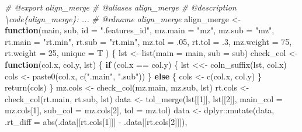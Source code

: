 \documentclass[
]{article}
\newenvironment{Shaded}{\begin{snugshade}}{\end{snugshade}}
\newcommand{\AttributeTok}[1]{\textcolor[rgb]{0.77,0.63,0.00}{#1}}
\newcommand{\CommentTok}[1]{\textcolor[rgb]{0.56,0.35,0.01}{\textit{#1}}}
\newcommand{\ControlFlowTok}[1]{\textcolor[rgb]{0.13,0.29,0.53}{\textbf{#1}}}
\newcommand{\DecValTok}[1]{\textcolor[rgb]{0.00,0.00,0.81}{#1}}
\newcommand{\FunctionTok}[1]{\textcolor[rgb]{0.00,0.00,0.00}{#1}}
\newcommand{\NormalTok}[1]{#1}
\newcommand{\OtherTok}[1]{\textcolor[rgb]{0.56,0.35,0.01}{#1}}
\newcommand{\SpecialCharTok}[1]{\textcolor[rgb]{0.00,0.00,0.00}{#1}}
\newcommand{\StringTok}[1]{\textcolor[rgb]{0.31,0.60,0.02}{#1}}
\begin{document}
\begin{Shaded}
\begin{Highlighting}[]
\CommentTok{\#\textquotesingle{} @export align\_merge}
\CommentTok{\#\textquotesingle{} @aliases align\_merge}
\CommentTok{\#\textquotesingle{} @description \textbackslash{}code\{align\_merge\}: ...}
\CommentTok{\#\textquotesingle{} @rdname align\_merge}
\NormalTok{align\_merge }\OtherTok{\textless{}{-}} 
  \ControlFlowTok{function}\NormalTok{(main, sub, }\AttributeTok{id =} \StringTok{".features\_id"}\NormalTok{,}
    \AttributeTok{mz.main =} \StringTok{"mz"}\NormalTok{, }\AttributeTok{mz.sub =} \StringTok{"mz"}\NormalTok{,}
    \AttributeTok{rt.main =} \StringTok{"rt.min"}\NormalTok{, }\AttributeTok{rt.sub =} \StringTok{"rt.min"}\NormalTok{,}
    \AttributeTok{mz.tol =}\NormalTok{ .}\DecValTok{05}\NormalTok{, }\AttributeTok{rt.tol =}\NormalTok{ .}\DecValTok{3}\NormalTok{, }\AttributeTok{mz.weight =} \DecValTok{75}\NormalTok{, }\AttributeTok{rt.weight =} \DecValTok{25}\NormalTok{,}
    \AttributeTok{unique =}\NormalTok{ T}
\NormalTok{    ) \{}
\NormalTok{    lst }\OtherTok{\textless{}{-}} \FunctionTok{list}\NormalTok{(}\AttributeTok{main =}\NormalTok{ main, }\AttributeTok{sub =}\NormalTok{ sub)}
\NormalTok{    check\_col }\OtherTok{\textless{}{-}} \ControlFlowTok{function}\NormalTok{(col.x, col.y, lst) \{}
      \ControlFlowTok{if}\NormalTok{ (col.x }\SpecialCharTok{==}\NormalTok{ col.y) \{}
\NormalTok{        lst }\OtherTok{\textless{}\textless{}{-}} \FunctionTok{coln\_suffix}\NormalTok{(lst, col.x)}
\NormalTok{        cols }\OtherTok{\textless{}{-}} \FunctionTok{paste0}\NormalTok{(col.x, }\FunctionTok{c}\NormalTok{(}\StringTok{".main"}\NormalTok{, }\StringTok{".sub"}\NormalTok{))}
\NormalTok{      \} }\ControlFlowTok{else}\NormalTok{ \{}
\NormalTok{        cols }\OtherTok{\textless{}{-}} \FunctionTok{c}\NormalTok{(col.x, col.y)}
\NormalTok{      \}}
      \FunctionTok{return}\NormalTok{(cols)}
\NormalTok{    \}}
\NormalTok{    mz.cols }\OtherTok{\textless{}{-}} \FunctionTok{check\_col}\NormalTok{(mz.main, mz.sub, lst)}
\NormalTok{    rt.cols }\OtherTok{\textless{}{-}} \FunctionTok{check\_col}\NormalTok{(rt.main, rt.sub, lst)}
\NormalTok{    data }\OtherTok{\textless{}{-}} \FunctionTok{tol\_merge}\NormalTok{(lst[[}\DecValTok{1}\NormalTok{]], lst[[}\DecValTok{2}\NormalTok{]], }\AttributeTok{main\_col =}\NormalTok{ mz.cols[}\DecValTok{1}\NormalTok{],}
      \AttributeTok{sub\_col =}\NormalTok{ mz.cols[}\DecValTok{2}\NormalTok{], }\AttributeTok{tol =}\NormalTok{ mz.tol)}
\NormalTok{    data }\OtherTok{\textless{}{-}}\NormalTok{ dplyr}\SpecialCharTok{::}\FunctionTok{mutate}\NormalTok{(data, }\AttributeTok{.rt\_diff =} \FunctionTok{abs}\NormalTok{(.data[[rt.cols[}\DecValTok{1}\NormalTok{]]] }\SpecialCharTok{{-}}\NormalTok{ .data[[rt.cols[}\DecValTok{2}\NormalTok{]]]),}

\end{Highlighting}
\end{Shaded}
\end{document}
